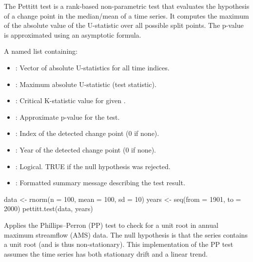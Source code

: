 \documentclass[a4paper]{book}
\begin{document}
%
\begin{Details}
The Pettitt test is a rank-based non-parametric test that evaluates the
hypothesis of a change point in the median/mean of a time series.
It computes the maximum of the absolute value of the U-statistic over all
possible split points. The p-value is approximated using an asymptotic formula.
\end{Details}
%
\begin{Value}
A named list containing:
\begin{itemize}

\item{} : Vector of absolute U-statistics for all time indices.
\item{} : Maximum absolute U-statistic (test statistic).
\item{} : Critical K-statistic value for given .
\item{} : Approximate p-value for the test.
\item{} : Index of the detected change point (0 if none).
\item{} : Year of the detected change point (0 if none).
\item{} : Logical. TRUE if the null hypothesis was rejected.
\item{} : Formatted summary message describing the test result.

\end{itemize}

\end{Value}
%
\begin{SeeAlso}
\end{SeeAlso}
%
\begin{Examples}
\begin{ExampleCode}
data <- rnorm(n = 100, mean = 100, sd = 10)
years <- seq(from = 1901, to = 2000)
pettitt.test(data, years)

\end{ExampleCode}
\end{Examples}
%
\begin{Description}
Applies the Phillips–Perron (PP) test to check for a unit root in annual
maximum streamflow (AMS) data. The null hypothesis is that the series contains a
unit root (and is thus non-stationary). This implementation of the PP test assumes
the  time series has both stationary drift and a linear trend.
\end{Description}
\end{document}
